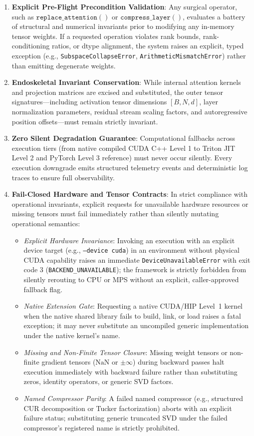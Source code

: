 \begin{enumerate}
    \item \textbf{Explicit Pre-Flight Precondition Validation}: Any surgical operator, such as $\mathtt{replace\_attention}()$ or $\mathtt{compress\_layer}()$, evaluates a battery of structural and numerical invariants prior to modifying any in-memory tensor weights. If a requested operation violates rank bounds, rank-conditioning ratios, or dtype alignment, the system raises an explicit, typed exception (e.g., \texttt{SubspaceCollapseError}, \texttt{ArithmeticMismatchError}) rather than emitting degenerate weights.
    \item \textbf{Endoskeletal Invariant Conservation}: While internal attention kernels and projection matrices are excised and substituted, the outer tensor signatures---including activation tensor dimensions $[B, N, d]$, layer normalization parameters, residual stream scaling factors, and autoregressive position offsets---must remain strictly invariant.
    \item \textbf{Zero Silent Degradation Guarantee}: Computational fallbacks across execution tiers (from native compiled CUDA C++ Level 1 to Triton JIT Level 2 and PyTorch Level 3 reference) must never occur silently. Every execution downgrade emits structured telemetry events and deterministic log traces to ensure full observability.
    \item \textbf{Fail-Closed Hardware and Tensor Contracts}: In strict compliance with operational invariants, explicit requests for unavailable hardware resources or missing tensors must fail immediately rather than silently mutating operational semantics:
    \begin{itemize}
        \item \emph{Explicit Hardware Invariance}: Invoking an execution with an explicit device target (e.g., \texttt{--device cuda}) in an environment without physical CUDA capability raises an immediate \texttt{DeviceUnavailableError} with exit code 3 (\texttt{BACKEND\_UNAVAILABLE}); the framework is strictly forbidden from silently rerouting to CPU or MPS without an explicit, caller-approved fallback flag.
        \item \emph{Native Extension Gate}: Requesting a native CUDA/HIP Level~1 kernel when the native shared library fails to build, link, or load raises a fatal exception; it may never substitute an uncompiled generic implementation under the native kernel's name.
        \item \emph{Missing and Non-Finite Tensor Closure}: Missing weight tensors or non-finite gradient tensors ($\mathrm{NaN}$ or $\pm\infty$) during backward passes halt execution immediately with backward failure rather than substituting zeros, identity operators, or generic SVD factors.
        \item \emph{Named Compressor Parity}: A failed named compressor (e.g., structured CUR decomposition or Tucker factorization) aborts with an explicit failure status; substituting generic truncated SVD under the failed compressor's registered name is strictly prohibited.
    \end{itemize}
\end{enumerate}

